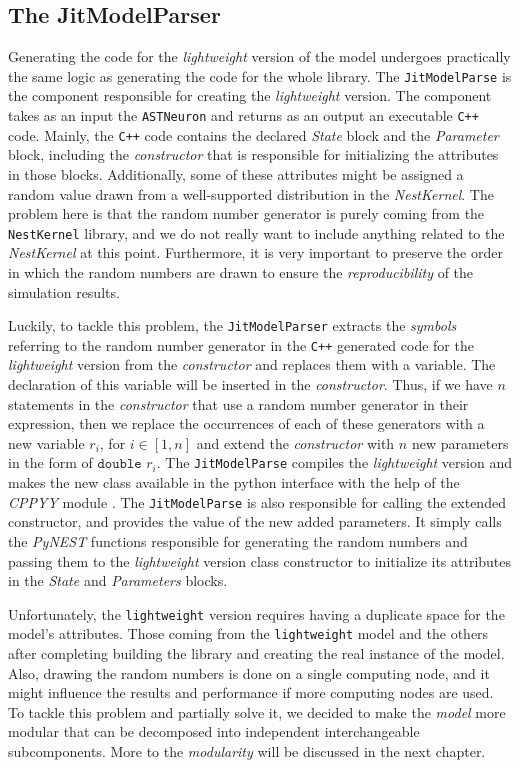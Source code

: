 \subsection{The JitModelParser}

Generating the code for the \emph{lightweight} version of the model undergoes practically the same logic as generating the code for the whole library.  The \texttt{JitModelParse} is the component responsible for creating the \emph{lightweight} version. The component takes as an input the \texttt{ASTNeuron} and returns as an output an executable \texttt{C++} code. Mainly, the \texttt{C++} code contains the declared \emph{State} block and the \emph{Parameter} block, including the \emph{constructor} that is responsible for initializing the attributes in those blocks. Additionally, some of these attributes might  be assigned a random value drawn from a well-supported distribution in the \emph{NestKernel}. The problem here is that the random number generator is purely coming from the \texttt{NestKernel} library, and we do not really want to include anything related to the \emph{NestKernel} at this point. Furthermore, it is very important to preserve the order in which the random numbers are drawn to ensure the \emph{reproducibility} of the simulation results.

Luckily, to tackle this problem, the \texttt{JitModelParser} extracts the \emph{symbols} referring to the random number generator in the \texttt{C++} generated code for the \emph{lightweight} version from the \emph{constructor} and replaces them with a variable. The declaration of this variable will be inserted in the \emph{constructor}. Thus, if we have $n$ statements in the \emph{constructor} that use a random number generator in their expression, then we replace the occurrences of each of these generators with a new variable $r_i$, for $i \in [1, n]$ and extend the \emph{constructor} with $n$ new parameters in the form of $\texttt{double } r_i$. The \texttt{JitModelParse} compiles the \emph{lightweight} version and makes the new class available in the python interface with the help of the \emph{CPPYY} module \citep{cppyy}. The \texttt{JitModelParse} is also responsible for calling the extended constructor, and provides the value of the new added parameters. It simply calls the \emph{PyNEST} functions responsible for generating the random numbers and passing them to the \emph{lightweight} version class constructor to initialize its attributes in the \emph{State} and \emph{Parameters} blocks.

Unfortunately, the \texttt{lightweight} version requires having a duplicate space for the model's attributes. Those coming from the \texttt{lightweight} model  and the others after completing building the library and creating the real instance of the model. Also, drawing the random numbers is done on a single computing node, and it might influence the results and performance if more computing nodes are used. To tackle this problem and partially solve it, we decided to make the \emph{model} more modular that can be decomposed into independent interchangeable subcomponents. More to the \emph{modularity} will be discussed in the next chapter.

